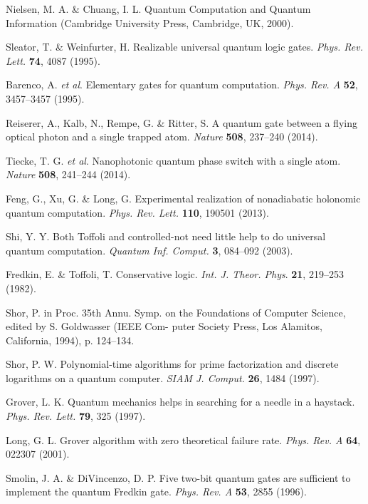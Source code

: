 \documentclass[showpacs,preprintnumbers,showkeys,amsmath,amssymb]{revtex4}%
\begin{document}
\begin{thebibliography}{61}




 Nielsen, M. A. \& Chuang, I. L. Quantum Computation and Quantum Information (Cambridge University Press, Cambridge, UK, 2000).

 Sleator, T. \& Weinfurter, H. Realizable universal quantum logic gates. \emph{Phys. Rev. Lett.} \textbf{74}, 4087 (1995).

 Barenco, A. \emph{et al}.  Elementary gates for quantum computation. \emph{Phys. Rev. A} \textbf{52}, 3457--3457 (1995).

 Reiserer, A.,  Kalb, N.,  Rempe, G. \&  Ritter, S. A quantum gate between a flying optical photon and a single trapped atom. \emph{Nature} \textbf{508}, 237--240 (2014).

 Tiecke, T. G. \emph{et al}. Nanophotonic quantum phase switch with a single atom.  \emph{Nature}  \textbf{508}, 241--244 (2014).

 Feng, G., Xu, G. \& Long, G. Experimental realization of nonadiabatic holonomic quantum computation. \emph{Phys. Rev. Lett.} \textbf{110}, 190501 (2013).

 Shi, Y. Y. Both Toffoli and controlled-not need little help to do universal quantum computation.
\emph{Quantum Inf. Comput.} \textbf{3}, 084--092 (2003).

 Fredkin, E. \& Toffoli, T. Conservative logic. \emph{Int. J. Theor. Phys}. \textbf{21}, 219--253 (1982).

  Shor, P. in Proc. 35th Annu. Symp. on the Foundations of Computer Science, edited by S. Goldwasser (IEEE Com-
puter Society Press, Los Alamitos, California, 1994), p. 124--134.

 Shor, P. W. Polynomial-time algorithms for prime factorization and discrete logarithms on a quantum computer. \emph{SIAM J. Comput.} \textbf{26}, 1484 (1997).


 Grover, L. K.  Quantum mechanics helps in searching for a needle in a haystack. \emph{Phys. Rev. Lett.} \textbf{79}, 325 (1997).


Long, G. L. Grover algorithm with zero theoretical failure rate. \emph{Phys. Rev. A} \textbf{64}, 022307 (2001).

 Smolin, J. A. \&  DiVincenzo, D. P. Five two-bit quantum gates are sufficient to implement the quantum Fredkin gate. \emph{Phys. Rev. A} \textbf{53}, 2855 (1996).




\end{thebibliography}
\end{document}
